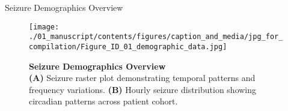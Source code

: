
Seizure Demographics Overview

\begin{figure*}[p]
    \centering
    \texttt{[image: ./01\_manuscript/contents/figures/caption\_and\_media/jpg\_for\_compilation/Figure\_ID\_01\_demographic\_data.jpg]}
    \caption{\textbf{
Seizure Demographics Overview
}
\smallskip
\\
\textbf{(A)} Seizure raster plot demonstrating temporal patterns and frequency variations.
\textbf{(B)} Hourly seizure distribution showing circadian patterns across patient cohort.
}
    \label{fig:01_demographic_data}
\end{figure*}

